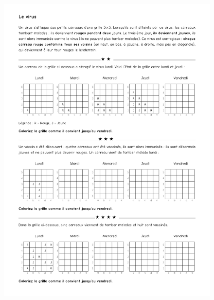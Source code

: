 \begin{figure}[H]
  \centering
  \includegraphics[width=0.95\linewidth]{4xDM/2-virus.pdf}
\end{figure}

